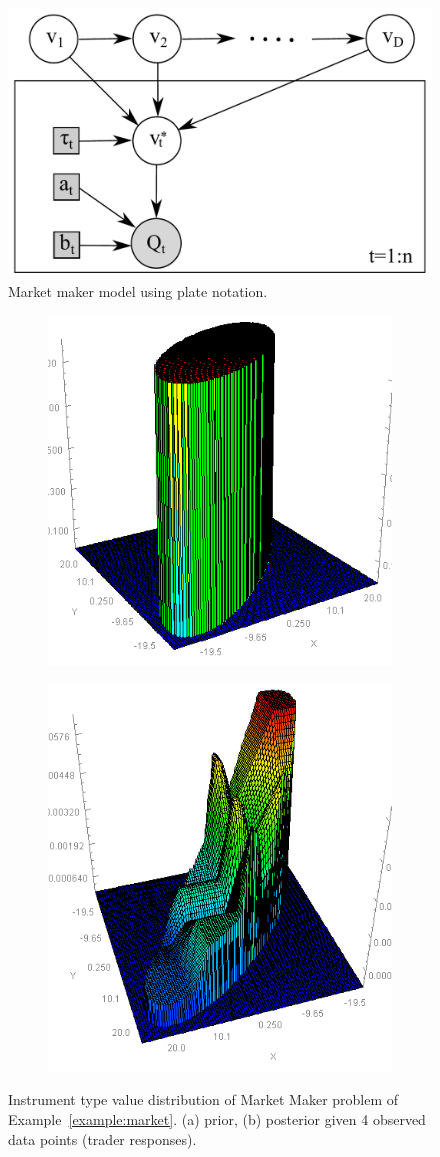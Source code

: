 \begin{figure}%
\centering
\includegraphics[width=.55\textwidth]{pic/market4.pdf}
\caption{\footnotesize Market maker model using plate notation. }
\label{fig:market}
\end{figure}
\begin{figure}
\centering
\begin{subfigure}{.36\textwidth}
  \centering
  \includegraphics[width=.6\textwidth]{pic/elipsePrior.png}
  \caption{}
  \label{fig:mmm.prior}
\end{subfigure}%
\begin{subfigure}{.45\textwidth}
  \centering
  \includegraphics[width=.45\textwidth]{pic/MM2.png}
  \caption{}
  \label{fig:mmm.posterior}
\end{subfigure}
\caption{\footnotesize Instrument type value distribution of Market Maker problem of Example~\ref{example:market}.
(a) prior, (b) posterior given 4 observed data points (trader responses).}
\label{fig:mmm}
\end{figure}


